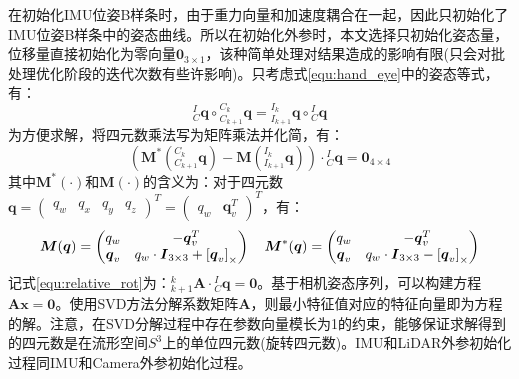 \label{subsubsec:init_extri_pos}
在初始化IMU位姿B样条时，由于重力向量和加速度耦合在一起，因此只初始化了IMU位姿B样条中的姿态曲线。所以在初始化外参时，本文选择只初始化姿态量，位移量直接初始化为零向量$\boldsymbol{0}_{3\times 1}$，该种简单处理对结果造成的影响有限(只会对批处理优化阶段的迭代次数有些许影响)。只考虑式\ref{equ:hand_eye}中的姿态等式，有：
\begin{equation}
  {{^{I}_{C}}\boldsymbol{q}}\circ{^{C_k}_{C_{k+1}}\boldsymbol{q}}={{^{I_k}_{I_{k+1}}}\boldsymbol{q}}\circ{^{I}_{C}\boldsymbol{q}}
\end{equation}
为方便求解，将四元数乘法写为矩阵乘法并化简，有：
\begin{equation}
  \label{equ:relative_rot}
  \left(\boldsymbol{M}^*\left({^{C_k}_{C_{k+1}}\boldsymbol{q}}\right)-\boldsymbol{M}\left({{^{I_k}_{I_{k+1}}}\boldsymbol{q}}\right)\right)\cdot{^{I}_{C}\boldsymbol{q}}=\boldsymbol{0}_{4\times 4}
\end{equation}
其中$\boldsymbol{M}^*(\cdot)$和$\boldsymbol{M}(\cdot)$的含义为：对于四元数$\boldsymbol{q}=\begin{pmatrix}	q_w&q_x&q_y&q_z	\end{pmatrix}^T=\begin{pmatrix}	q_w&\boldsymbol{q}_v^T	\end{pmatrix}^T$，有：
\begin{equation}
  \boldsymbol{M}(\boldsymbol{q})=\begin{pmatrix}
    q_w              & -\boldsymbol{q}_v^T                                          \\
    \boldsymbol{q}_v & q_w\cdot\boldsymbol{I}_{3\times 3}+\left[ \boldsymbol{q}_v \right]_\times
  \end{pmatrix}\quad
  \boldsymbol{M}^*(\boldsymbol{q})=\begin{pmatrix}
    q_w              & -\boldsymbol{q}_v^T                                          \\
    \boldsymbol{q}_v & q_w\cdot\boldsymbol{I}_{3\times 3}-\left[ \boldsymbol{q}_v \right]_\times
  \end{pmatrix}
\end{equation}
记式\ref{equ:relative_rot}为：${^{k}_{k+1}\boldsymbol{A}}\cdot{^{I}_{C}\boldsymbol{q}}=\boldsymbol{0}$。基于相机姿态序列，可以构建方程$\boldsymbol{A}\boldsymbol{x}=\boldsymbol{0}$。使用SVD方法\cite{barfoot2017state}分解系数矩阵$\boldsymbol{A}$，则最小特征值对应的特征向量即为方程的解。注意，在SVD分解过程中存在参数向量模长为1的约束，能够保证求解得到的四元数是在流形空间$S^3$上的单位四元数(旋转四元数)。IMU和LiDAR外参初始化过程同IMU和Camera外参初始化过程。

